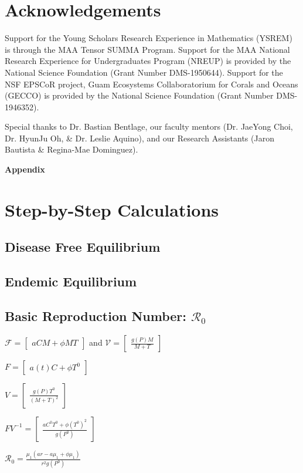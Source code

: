 \documentclass[12pt]{article}
\begin{document}
\section{Acknowledgements}
Support for the Young Scholars Research Experience in Mathematics (YSREM)  is through the MAA Tensor SUMMA Program. Support for the MAA National Research Experience for Undergraduates Program (NREUP) is provided by the National Science Foundation (Grant Number DMS-1950644). Support for the NSF EPSCoR project, Guam Ecosystems Collaboratorium for Corals and Oceans (GECCO) is provided by the National Science Foundation (Grant Number DMS-1946352). \par
Special thanks to Dr. Bastian Bentlage, our faculty mentors (Dr. JaeYong Choi, Dr. HyunJu Oh, \& Dr. Leslie Aquino), and our Research Assistants (Jaron Bautista \& Regina-Mae Dominguez).

\newpage
\appendix
    {\huge \textbf{Appendix}}
    \section{Step-by-Step Calculations}
    \subsection{Disease Free Equilibrium}
    \subsection{Endemic Equilibrium}
    \subsection{Basic Reproduction Number: $\mathscr{R}_0$}
    
    $\mathscr{F} = 
    \begin{bmatrix} aCM + \phi MT \end{bmatrix}$ and $\mathscr{V} = \begin{bmatrix} \frac{g(P)M}{M+T} \end{bmatrix}$
    
    $F = \begin{bmatrix}
    a(t)C + \phi T^{0}
    \end{bmatrix}$
    
    $V = \begin{bmatrix}
    \frac{g(P)T^{0}}{(M+T)^{2}}
    \end{bmatrix}$
    
    \begin{center}
    $FV^{-1} = \begin{bmatrix}
    \frac{aC^{0}T^{0} + \phi (T^{0})^{2}}{g(P^{0})}
    \end{bmatrix}$
    
    $\mathscr{R}_{0} = \frac{\mu_{1}(a r - a\mu_{1} + \phi \mu_{1})}{r^{2}g(P^{0})}$
    \end{center}
    
\end{document}
